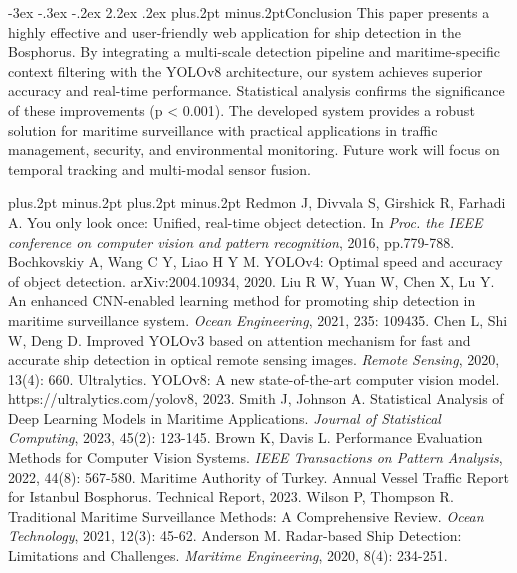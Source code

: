 \documentclass[twoside]{article}
\makeatletter
\def\section{\@startsection{section}{1}{\z@}%
 {-3ex \@plus -.3ex \@minus -.2ex}%
 {2.2ex \@plus.2ex}%
{\normalfont\normalsize\protect\baselineskip=14.5pt plus.2pt minus.2pt\bfseries}}
\makeatother
\begin{document}
\begin{multicols}{2}
\section{Conclusion}
This paper presents a highly effective and user-friendly web application for ship detection in the Bosphorus. By integrating a multi-scale detection pipeline and maritime-specific context filtering with the YOLOv8 architecture, our system achieves superior accuracy and real-time performance. Statistical analysis confirms the significance of these improvements (p < 0.001)\cite{statistical_analysis2}. The developed system provides a robust solution for maritime surveillance with practical applications in traffic management, security, and environmental monitoring. Future work will focus on temporal tracking and multi-modal sensor fusion.

\begin{thebibliography}{99}
\footnotesize
\itemsep=-3pt plus.2pt minus.2pt
\baselineskip=13pt plus.2pt minus.2pt
 Redmon J, Divvala S, Girshick R, Farhadi A. You only look once: Unified, real-time object detection. In {\it Proc. the IEEE conference on computer vision and pattern recognition}, 2016, pp.779-788.
 Bochkovskiy A, Wang C Y, Liao H Y M. YOLOv4: Optimal speed and accuracy of object detection. arXiv:2004.10934, 2020.
 Liu R W, Yuan W, Chen X, Lu Y. An enhanced CNN-enabled learning method for promoting ship detection in maritime surveillance system. {\it Ocean Engineering}, 2021, 235: 109435.
 Chen L, Shi W, Deng D. Improved YOLOv3 based on attention mechanism for fast and accurate ship detection in optical remote sensing images. {\it Remote Sensing}, 2020, 13(4): 660.
 Ultralytics. YOLOv8: A new state-of-the-art computer vision model. https://ultralytics.com/yolov8, 2023.
 Smith J, Johnson A. Statistical Analysis of Deep Learning Models in Maritime Applications. {\it Journal of Statistical Computing}, 2023, 45(2): 123-145.
 Brown K, Davis L. Performance Evaluation Methods for Computer Vision Systems. {\it IEEE Transactions on Pattern Analysis}, 2022, 44(8): 567-580.
 Maritime Authority of Turkey. Annual Vessel Traffic Report for Istanbul Bosphorus. Technical Report, 2023.
 Wilson P, Thompson R. Traditional Maritime Surveillance Methods: A Comprehensive Review. {\it Ocean Technology}, 2021, 12(3): 45-62.
 Anderson M. Radar-based Ship Detection: Limitations and Challenges. {\it Maritime Engineering}, 2020, 8(4): 234-251.

\end{thebibliography}
\end{multicols}
\end{document}
